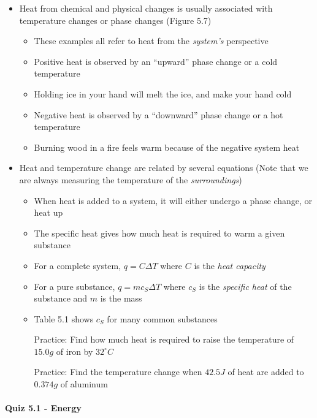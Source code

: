 \documentclass[12pt, openany, letterpaper]{memoir}
\begin{document}
\begin{itemize}
\begin{itemize}
      \item Isolated systems cannot exchange either heat or matter with the surroundings (a closed, insulated flask)
    \end{itemize}
	\item Heat from chemical and physical changes is usually associated with temperature changes or phase changes (Figure 5.7)
    \begin{itemize}
      \item These examples all refer to heat from the \emph{system's} perspective
      \item Positive heat is observed by an “upward” phase change or a cold temperature
      \item Holding ice in your hand will melt the ice, and make your hand cold
      \item Negative heat is observed by a “downward” phase change or a hot temperature
      \item Burning wood in a fire feels warm because of the negative system heat
    \end{itemize}
  \item Heat and temperature change are related by several equations (Note that we are always measuring the temperature of the \emph{surroundings})
    \begin{itemize}
      \item When heat is added to a system, it will either undergo a phase change, or heat up
      \item The specific heat gives how much heat is required to warm a given substance
      \item For a complete system, $q=C\Delta T$ where $C$ is the \emph{heat capacity}
      \item For a pure substance, $q=mc_S\Delta T$ where $c_S$ is the \emph{specific heat} of the substance and $m$ is the mass
      \item Table 5.1 shows $c_S$ for many common substances

        Practice: Find how much heat is required to raise the temperature of $15.0g$ of iron by $32^\circ C$

        Practice: Find the temperature change when $42.5J$ of heat are added to $0.374g$ of aluminum
    \end{itemize}
\end{itemize}

\paragraph*{Quiz 5.1 - Energy}
\end{document}
